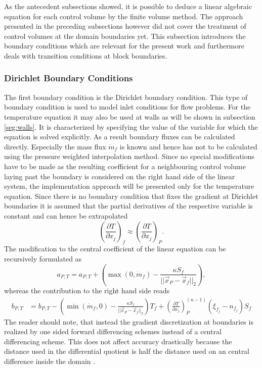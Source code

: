   As the antecedent subsections showed, it is possible to deduce a linear algebraic equation for each control volume by the finite volume method. The approach presented in the preceding subsections however did not cover the treatment of control volumes at the domain boundaries yet. This subsection introduces the boundary conditions which are relevant for the present work and furthermore deals with transition conditions at block boundaries.

  \subsubsection{Dirichlet Boundary Conditions}

  The first boundary condition is the Dirichlet boundary condition. This type of boundary condition is used to model inlet conditions for flow problems. For the temperature equation it may also be used at walls as will be shown in subsection \ref{seg:walls}. It is characterized by specifying the value of the variable for which the equation is solved explicitly. As a result boundary fluxes can be calculated directly. Especially the mass flux \(\dot{m}_f\) is known and hence has not to be calculated using the pressure weighted interpolation method. Since no special modifications have to be made as the resulting coefficient for a neighbouring control volume laying past the boundary is considered on the right hand side of the linear system, the implementation approach will be presented only for the temperature equation. Since there is no boundary condition that fixes the gradient at Dirichlet boundaries it is assumed that the partial derivatives of the respective variable is constant and can hence be extrapolated
  \begin{displaymath}
    \left( \frac{\partial T}{\partial x_j} \right)_f \approx \left( \frac{\partial T}{\partial x_j} \right)_P.
  \end{displaymath}
  The modification to the central coefficient of the linear equation can be recursively formulated as
  \begin{displaymath}
    a_{P,T} = a_{P,T} + \left( \max(0,\dot{m}_f )  - \frac{\kappa S_f}{|| \vec{x}_P - \vec{x}_f ||_2} \right),
  \end{displaymath}
  whereas the contribution to the right hand side reads
  \begin{align}
    b_{P,T} &= b_{P,T} - \left( \min(\dot{m}_f,0) - \frac{\kappa S_f}{||\vec{x}_P - \vec{x}_f||_2}\right) T_f +
    \left( \frac{\partial T}{\partial x_j}\right)_P^{(n-1)} \left(\xi_{f_j} - n_{f_j}\right)S_f \nonumber 
  \end{align}
  The reader should note, that instead the gradient discretization at boundaries is realized by one sided forward differencing schemes instead of a central differencing scheme. This does not affect accuracy drastically because the distance used in the differential quotient is half the distance used on an central difference inside the domain \cite{schaefer99}.

